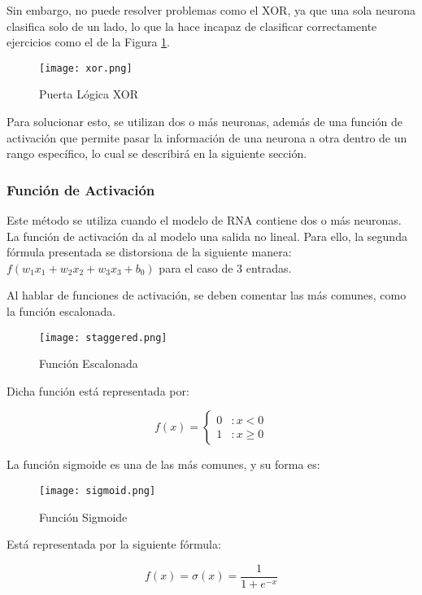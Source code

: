 Sin embargo, no puede resolver problemas como el XOR, ya que una sola neurona clasifica solo de un lado, lo que la hace incapaz de clasificar correctamente ejercicios como el de la Figura \ref{fig:fig3}.

\begin{figure}[H]
    \centering
    \texttt{[image: xor.png]}
    \caption{Puerta Lógica XOR}
    \label{fig:fig3}
\end{figure}

Para solucionar esto, se utilizan dos o más neuronas, además de una función de activación que permite pasar la información de una neurona a otra dentro de un rango específico, lo cual se describirá en la siguiente sección.

\subsubsection{Función de Activación} \label{sec:activation}

Este método se utiliza cuando el modelo de RNA contiene dos o más neuronas. La función de activación da al modelo una salida no lineal. Para ello, la segunda fórmula presentada se distorsiona de la siguiente manera: $f(w_1x_1 + w_2x_2 + w_3x_3 + b_0)$ para el caso de 3 entradas.

Al hablar de funciones de activación, se deben comentar las más comunes, como la función escalonada.

\begin{figure}[H]
    \centering
    \texttt{[image: staggered.png]}
    \caption{Función Escalonada}
    \label{fig:fig4}
\end{figure}

Dicha función está representada por:

\[
f(x) = \left\{ \begin{array}{lr} 
0 & : x < 0 \\
1 & : x \ge 0 
\end{array} \right.
\]

La función sigmoide es una de las más comunes, y su forma es:

\begin{figure}[H]
    \centering
    \texttt{[image: sigmoid.png]}
    \caption{Función Sigmoide}
    \label{fig:fig5}
\end{figure}

Está representada por la siguiente fórmula:

\[
f(x) = \sigma(x) =  \frac{1}{1 + e^{-x}}
\]

